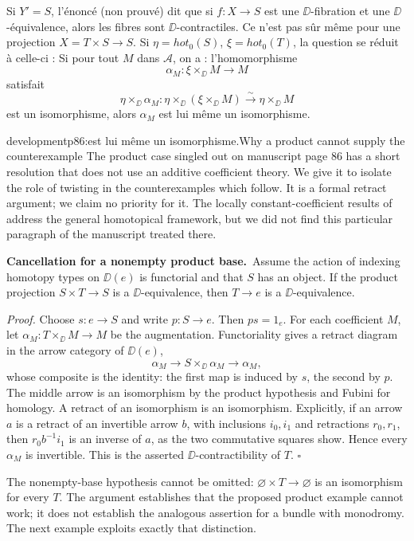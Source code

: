 
Si $Y' = S$, l'énoncé (non prouvé) dit que si $f : X \to S$ est une $\DD$-fibration et une $\DD$-équivalence, alors les fibres sont $\DD$-contractiles. Ce n'est pas sûr même pour une projection $X = T \times S \to S$. Si $\eta = \mathit{hot}_0(S)$, $\xi = \mathit{hot}_0(T)$, la question se réduit à celle-ci : Si pour tout $M$ dans $\mathcal{A}$, on a : l'homomorphisme
\[
\alpha_M : \xi \times_{\DD} M \longrightarrow M
\]
satisfait
\[
\eta \times_{\DD} \alpha_M : \eta \times_{\DD} (\xi \times_{\DD} M) \xrightarrow{\sim} \eta \times_{\DD} M
\]
est un isomorphisme, alors $\alpha_M$ est lui même un isomorphisme.

\begin{dcomment}{development}{p86:est lui même un isomorphisme.}{Why a product cannot supply the counterexample}
The product case singled out on manuscript page 86 has a short resolution that does not use an additive coefficient theory. We give it to isolate the role of twisting in the counterexamples which follow. It is a formal retract argument; we claim no priority for it. The locally constant-coefficient results of \citet{Cisinski2009LocallyConstant} address the general homotopical framework, but we did not find this particular paragraph of the manuscript treated there.

\textbf{Cancellation for a nonempty product base.}\ours\
Assume the action of indexing homotopy types on $\DD(e)$ is functorial and that $S$ has an object. If the product projection $S\times T\to S$ is a $\DD$-equivalence, then $T\to e$ is a $\DD$-equivalence.

\emph{Proof.} Choose $s:e\to S$ and write $p:S\to e$. Then $ps=1_e$. For each coefficient $M$, let $\alpha_M:T\times_{\DD}M\to M$ be the augmentation. Functoriality gives a retract diagram in the arrow category of $\DD(e)$,
\[
 \alpha_M\longrightarrow S\times_{\DD}\alpha_M
                   \longrightarrow\alpha_M,
\]
whose composite is the identity: the first map is induced by $s$, the second by $p$. The middle arrow is an isomorphism by the product hypothesis and Fubini for homology. A retract of an isomorphism is an isomorphism. Explicitly, if an arrow $a$ is a retract of an invertible arrow $b$, with inclusions $i_0,i_1$ and retractions $r_0,r_1$, then $r_0b^{-1}i_1$ is an inverse of $a$, as the two commutative squares show. Hence every $\alpha_M$ is invertible. This is the asserted $\DD$-contractibility of $T$. \hfill$\square$

The nonempty-base hypothesis cannot be omitted: $\varnothing\times T\to\varnothing$ is an isomorphism for every $T$. The argument establishes that the proposed product example cannot work; it does not establish the analogous assertion for a bundle with monodromy. The next example exploits exactly that distinction.
\end{dcomment}


